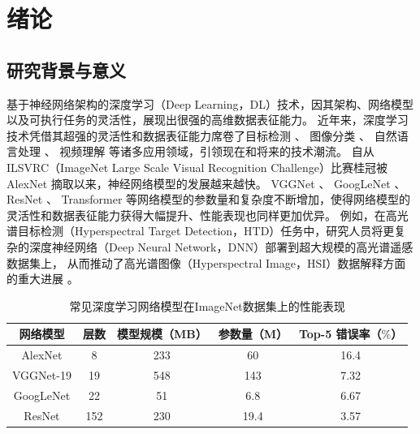 \documentclass{xdupgthesis}
\begin{document}
\chapter{绪论}
\section{研究背景与意义}
基于神经网络架构的深度学习（Deep Learning，DL）技术，因其架构、网络模型以及可执行任务的灵活性，展现出很强的高维数据表征能力。
近年来，深度学习技术凭借其超强的灵活性和数据表征能力席卷了目标检测 \cite{liu2016ssd} \cite{lin2018don}  \cite{lin2017feature}、
图像分类 \cite{song2020large} \cite{simonyan2014very} \cite{xie2020self}、
自然语言处理 \cite{zhang2016deep} \cite{lee2009unsupervised}、
视频理解 \cite{brattoli2020rethinking} \cite{xie2018rethinking} \cite{yuan2020central} 等诸多应用领域，引领现在和将来的技术潮流。
自从ILSVRC（ImageNet Large Scale Visual Recognition Challenge）比赛桂冠被AlexNet \cite{krizhevsky2012imagenet}摘取以来，神经网络模型的发展越来越快。
VGGNet \cite{simonyan2014very}、
GoogLeNet \cite{szegedy2015going}、
ResNet \cite{he2016deep}、
Transformer \cite{vaswani2017attention}等网络模型的参数量和复杂度不断增加，使得网络模型的灵活性和数据表征能力获得大幅提升、性能表现也同样更加优异。
例如，在高光谱目标检测（Hyperspectral Target Detection，HTD）任务中，研究人员将更复杂的深度神经网络（Deep Neural Network，DNN）部署到超大规模的高光谱遥感数据集上，
从而推动了高光谱图像（Hyperspectral Image，HSI）数据解释方面的重大进展 \cite{zare2017discriminative} \cite{jiang2021lren} \cite{xie2021weakly}。

\renewcommand{\arraystretch}{1.3}
\begin{table}[ht]
    \centering
    \caption{常见深度学习网络模型在ImageNet数据集上的性能表现}
    \label{tab_ModelOnImagenet}
    \begin{tabular}{c|c|c|c|c}
        \toprule
        \toprule
            网络模型 & 层数 & 模型规模（MB） & 参数量（M） & Top-5 错误率（$\%$）\\
        \midrule
            AlexNet \cite{krizhevsky2012imagenet} & 8 & 233 & 60 & 16.4 \\
            VGGNet-19 \cite{simonyan2014very} & 19 & 548 & 143 & 7.32 \\
            GoogLeNet \cite{szegedy2015going} & 22 & 51 & 6.8 & 6.67 \\
            ResNet \cite{he2016deep} & 152 & 230 & 19.4 & 3.57 \\
        \bottomrule
        \bottomrule
    \end{tabular}
\end{table}
\end{document}

